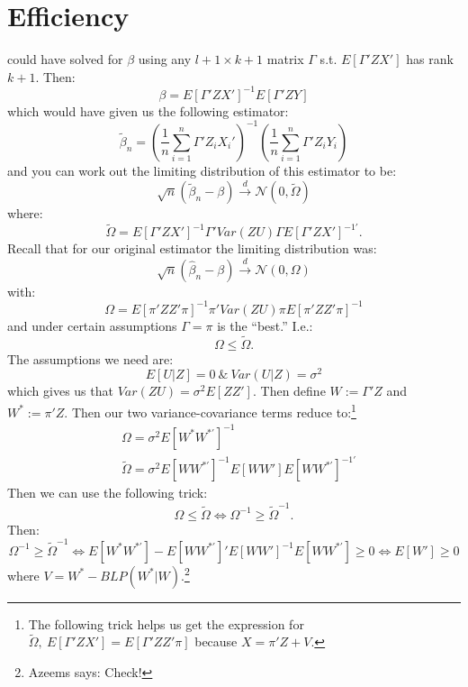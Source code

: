 \documentclass{tufte-book}
\theoremstyle{mytheoremstyle}
\theoremstyle{mylemstyle}
\theoremstyle{mydefstyle}
\begin{document}
\section{Efficiency} 
 could have solved for \(\beta\) using any \(l+1 \times k+1\) matrix \(\Gamma\) s.t. \(E[\Gamma' ZX']\) has rank \(k+1\). Then:
	\[\beta = E[\Gamma' Z X']^{-1}E[\Gamma'ZY]\]
which would have given us the following estimator:
	\[\tilde{\beta}_n = \left(\frac{1}{n}\sum_{i=1}^n \Gamma' Z_i X_i'\right)^{-1} \left(\frac{1}{n} \sum_{i=1}^n \Gamma' Z_i Y_i\right)\]
and you can work out the limiting distribution of this estimator to be:
	\[\sqrt{n}(\tilde{\beta}_n - \beta) \overset{d}{\rightarrow} \mathcal{N}(0, \tilde{\Omega})\]
where:
	\[\tilde{\Omega} = E[\Gamma'ZX']^{-1}\Gamma'Var(ZU)\Gamma E[\Gamma'ZX']^{-1'} \text{.}\]
Recall that for our original estimator the limiting distribution was:
	\[\sqrt{n}(\hat{\beta}_n - \beta) \overset{d}{\rightarrow} \mathcal{N}(0, \Omega)\]
with:
	\[\Omega = E[\pi' ZZ' \pi]^{-1}\pi' Var(ZU) \pi E[\pi' ZZ' \pi]^{-1}\]
and under certain assumptions \(\Gamma = \pi\) is the ``best.'' I.e.:
	\[\Omega \le \tilde{\Omega} \text{.}\]
The assumptions we need are:
	\[E[U|Z] = 0\ \&\ Var(U|Z) = \sigma^2\]
which gives us that \(Var(ZU) = \sigma^2E[ZZ']\). Then define \(W:=\Gamma' Z\) and \(W^* := \pi' Z\). Then our two variance-covariance terms reduce to:\footnote{The following trick helps us get the expression for \(\tilde{\Omega},\ E[\Gamma'ZX'] = E[\Gamma'ZZ'\pi]\) because \(X = \pi'Z + V\).}
	\begin{align*}
		& \Omega = \sigma^2 E[W^* W^{*'}]^{-1} \\
		& \tilde{\Omega} = \sigma^2E[WW^{*'}]^{-1}E[WW'] E[WW^{*'}]^{-1'}
	\end{align*}
Then we can use the following trick:
	\[\Omega \le \tilde{\Omega} \iff \Omega^{-1} \ge \tilde{\Omega}^{-1} \text{.}\]
Then:
	\[\Omega^{-1} \ge \tilde{\Omega}^{-1} \iff E[W^*W^{*'}] - E[WW^{*'}]' E[WW']^{-1} E[WW^{*'}] \ge 0 \iff E[W'] \ge 0\]
where \(V = W^* - BLP(W^*|W)\).\footnote{Azeems says: Check!}
\end{document}
